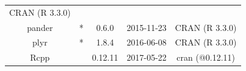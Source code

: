 \documentclass[]{article}
\begin{document}
\begin{itemize}
\begin{longtable}[]{@{}ccccc@{}}
\begin{minipage}[t]{0.29\columnwidth}
  CRAN (R 3.3.0)\strut
  \end{minipage}\tabularnewline
  \begin{minipage}[t]{0.13\columnwidth}\centering\strut
  pander\strut
  \end{minipage} & \begin{minipage}[t]{0.05\columnwidth}\centering\strut
  *\strut
  \end{minipage} & \begin{minipage}[t]{0.13\columnwidth}\centering\strut
  0.6.0\strut
  \end{minipage} & \begin{minipage}[t]{0.13\columnwidth}\centering\strut
  2015-11-23\strut
  \end{minipage} & \begin{minipage}[t]{0.29\columnwidth}\centering\strut
  CRAN (R 3.3.0)\strut
  \end{minipage}\tabularnewline
  \begin{minipage}[t]{0.13\columnwidth}\centering\strut
  plyr\strut
  \end{minipage} & \begin{minipage}[t]{0.05\columnwidth}\centering\strut
  *\strut
  \end{minipage} & \begin{minipage}[t]{0.13\columnwidth}\centering\strut
  1.8.4\strut
  \end{minipage} & \begin{minipage}[t]{0.13\columnwidth}\centering\strut
  2016-06-08\strut
  \end{minipage} & \begin{minipage}[t]{0.29\columnwidth}\centering\strut
  CRAN (R 3.3.0)\strut
  \end{minipage}\tabularnewline
  \begin{minipage}[t]{0.13\columnwidth}\centering\strut
  Rcpp\strut
  \end{minipage} & \begin{minipage}[t]{0.05\columnwidth}\centering\strut
  \strut
  \end{minipage} & \begin{minipage}[t]{0.13\columnwidth}\centering\strut
  0.12.11\strut
  \end{minipage} & \begin{minipage}[t]{0.13\columnwidth}\centering\strut
  2017-05-22\strut
  \end{minipage} & \begin{minipage}[t]{0.29\columnwidth}\centering\strut
  cran (@0.12.11)\strut

\end{minipage}
\end{longtable}
\end{itemize}
\end{document}
